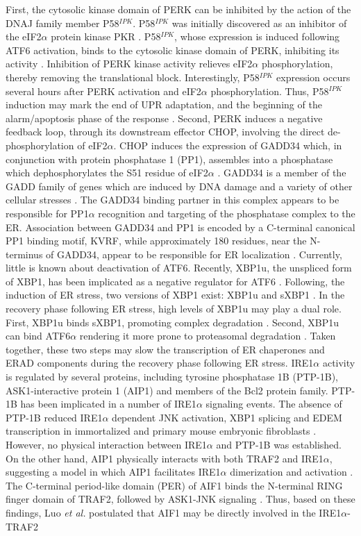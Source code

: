 \documentclass[fleqn,10pt]{wlscirep}
\begin{document}
\iffalse
First, the cytosolic kinase domain of PERK can be inhibited by the action of the DNAJ family member P58$^{IPK}$. P58$^{IPK}$ was initially discovered as an inhibitor of the eIF2$\alpha$ protein kinase PKR \cite{Lee:1990ye}. P58$^{IPK}$, whose expression is induced following ATF6 activation, binds to the cytosolic kinase domain of PERK, inhibiting its activity \cite{Yan:2002fk,Huizen:2003qo}. Inhibition of PERK kinase activity relieves eIF2$\alpha$ phosphorylation, thereby removing the translational block. Interestingly, P58$^{IPK}$ expression occurs several hours after PERK activation and eIF2$\alpha$ phosphorylation. Thus, P58$^{IPK}$ induction may mark the end of UPR adaptation, and the beginning of the alarm/apoptosis phase of the response \cite{szegezdi2006mediators}. Second, PERK induces a negative feedback loop, through its downstream effector CHOP, involving the direct de-phosphorylation of eIF2$\alpha$. CHOP induces the expression of GADD34 which, in conjunction with protein phosphatase 1 (PP1), assembles into a phosphatase which dephosphorylates the S51 residue of eIF2$\alpha$ \cite{Novoa:2001mb}. GADD34 is a member of the GADD family of genes which are induced by DNA damage and a variety of other cellular stresses \cite{Zhan:1994cq}. The GADD34 binding partner in this complex appears to be responsible for PP1$\alpha$ recognition and targeting of the phosphatase complex to the ER. Association between GADD34 and PP1 is encoded by a C-terminal canonical PP1 binding motif, KVRF, while approximately 180 residues, near the N-terminus of GADD34, appear to be responsible for ER localization \cite{Brush:2003kh}. Currently, little is known about deactivation of ATF6. Recently, XBP1u, the unspliced form of XBP1, has been implicated as a negative regulator for ATF6 \cite{Yoshida:2009bs}. Following, the induction of ER stress, two versions of XBP1 exist: XBP1u and sXBP1 \cite{Yoshida:2009bs}. In the recovery phase following ER stress, high levels of XBP1u may play a dual role. First, XBP1u binds sXBP1, promoting complex degradation \cite{Yoshida:2006dz, Tirosh:2006fv}. Second, XBP1u can bind ATF6$\alpha$ rendering it more prone to proteasomal degradation \cite{Yoshida:2009bs}. Taken together, these two steps may slow the transcription of ER chaperones and ERAD components during the recovery phase following ER stress. IRE1$\alpha$ activity is regulated by several proteins, including tyrosine phosphatase 1B (PTP-1B), ASK1-interactive protein 1 (AIP1) and members of the Bcl2 protein family. PTP-1B has been implicated in a number of IRE1$\alpha$ signaling events. The absence of PTP-1B reduced IRE1$\alpha$ dependent JNK activation, XBP1 splicing and EDEM transcription in immortalized and primary mouse embryonic fibroblasts \cite{Gu:2004kx}. However, no physical interaction between IRE1$\alpha$ and PTP-1B was established. On the other hand, AIP1 physically interacts with both TRAF2 and IRE1$\alpha$, suggesting a model in which AIP1 facilitates IRE1$\alpha$ dimerization and activation \cite{Luo:2008ly}. The C-terminal period-like domain (PER) of AIF1 binds the N-terminal RING finger domain of TRAF2, followed by ASK1-JNK signaling \cite{Zhang:2004ve}. Thus, based on these findings, Luo \emph{et al.} postulated that AIF1 may be directly involved in the IRE1$\alpha$-TRAF2 
\end{document}
